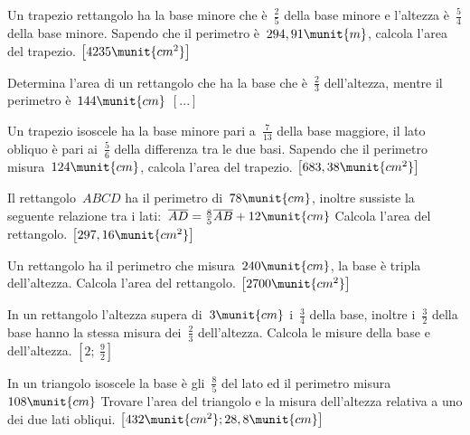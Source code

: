 \begin{htmulticols}{2}
\begin{esercizio}[*]
\label{ese:14.89}
Un trapezio rettangolo ha la base minore che è~\(\frac{2}{5}\) della base 
minore 
e 
l'altezza è~\(\frac{5}{4}\) della base minore. Sapendo che il perimetro 
è~\(294,91\munit{m}\), calcola l'area del trapezio. 
\hfill \(\left[4235\munit{cm^2}\right]\)
\end{esercizio}

\begin{esercizio}[*]
\label{ese:14.90}
Determina l'area di un rettangolo che ha la base che è~\(\frac{2}{3}\) 
dell'altezza, mentre il perimetro è~\(144\munit{cm}\) \hfill 
\(\left[...\right]\)
\end{esercizio}

\begin{esercizio}[*]
\label{ese:14.91}
Un trapezio isoscele ha la base minore pari a~\(\frac{7}{13}\) della base 
maggiore, il lato obliquo è pari ai~\(\frac{5}{6}\) della differenza tra le due 
basi. Sapendo che il perimetro misura~\(124\munit{cm}\), calcola l'area del 
trapezio. \hfill \(\left[683,38\munit{cm^2}\right]\)
\end{esercizio}

\begin{esercizio}[*]
\label{ese:14.92}
Il rettangolo~\(ABCD\) ha il perimetro di~\(78\munit{cm}\), inoltre sussiste la 
seguente relazione tra i 
lati:~\(\overline{AD}=\frac{8}{5}\overline{AB}+12\munit{cm}\) Calcola l'area 
del 
rettangolo. \hfill \(\left[297,16\munit{cm^2}\right]\)
\end{esercizio}

\begin{esercizio}[*]
\label{ese:14.93}
Un rettangolo ha il perimetro che misura~\(240\munit{cm}\), la base è tripla 
dell'altezza. Calcola l'area del rettangolo. 
\hfill \(\left[2700\munit{cm^2}\right]\)
\end{esercizio}

\begin{esercizio}[*]
\label{ese:14.94}
In un rettangolo l'altezza supera di~\(3\munit{cm}\) i~\(\frac{3}{4}\) della 
base, 
inoltre i~\(\frac{3}{2}\) della base hanno la stessa misura dei~\(\frac{2}{3}\) 
dell'altezza. Calcola le misure della base e dell'altezza.
 \hfill \(\left[2;~\frac{9}{2}\right]\)
\end{esercizio}

\begin{esercizio}[*]
\label{ese:14.95}
In un triangolo isoscele la base è gli~\(\frac{8}{5}\) del lato ed il perimetro 
misura~\(108\munit{cm}\) Trovare l'area del triangolo e la misura dell'altezza 
relativa a uno dei due lati obliqui. 
\hfill \(\left[432\munit{cm^2}; 28,8\munit{cm}\right]\)
\end{esercizio}


\end{htmulticols}
